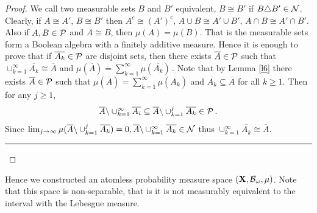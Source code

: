 \documentclass [11pt] {article}
\newcommand{\qed} {\hspace {0.1in} \rule {1.5mm} {3.5mm}}
\def\cB{\mbox{$\cal B$}}
\def\cB{\mbox{$\cal B$}}
\def\cP{\mbox{$\cal P$}}
\def\cN{\mbox{$\cal N$}}
\def\to{\rightarrow}
\def\xo{{\bf X}}
\def\bo{\cB_\omega}
\def\muo{\mu}
\begin{document}
\begin{proof}
We call two measurable sets $B$ and $B'$ equivalent, $B\cong B'$ if
$B\triangle B'\in \cN$.
Clearly, if $A\cong A'$, $B\cong B'$ then $A^c\cong (A')^c$,
$A\cup B\cong A'\cup B'$, $A\cap B\cong A'\cap B'$. Also if
$A,B\in\cP$ and $A\cong B$, then $\muo(A)=\muo(B)$. That is
the measurable sets form a Boolean algebra with a finitely additive measure.
Hence it is enough to prove that if $\overline{A_k}\in\cP$ are disjoint sets,
then there exists $\overline{A}\in\cP$ such that
$\cup^\infty_{k=1}\overline{A_k}\cong \overline{A}$ and
$\muo(\overline{A})=\sum^\infty_{k=1}\muo(\overline{A_k})\,.$
Note that by Lemma \ref{l6} there exists $\overline{A}\in\cP$ such that
$\muo(\overline{A})=\sum^\infty_{k=1}\muo(\overline{A_k})$ and
$\overline{A_k}\subseteq \overline{A}$ for all $k\geq 1$.
Then for any $j\geq 1$,
$$\overline{A}\backslash \cup^\infty_{k=1}\overline{A_i}\subseteq
 \overline{A}\backslash \cup^j_{k=1}\overline{A_k}\in \cP\,.$$
Since $\lim_{j\to\infty}\muo(\overline{A}\backslash
\cup^j_{k=1}\overline{A_k})=0,
\overline{A}\backslash \cup^\infty_{k=1}\overline{A_k}\in \cN$ thus
$\cup^\infty_{k=1}\overline{A_k}\cong
\overline{A}$.\qed \end{proof} \vskip 0.2in

\noindent
Hence we constructed an atomless probability measure space $(\xo,\bo,\muo)$.
Note that this space is non-separable, that is it is not measurably
equivalent to the interval with the Lebesgue measure.
\end{document}
